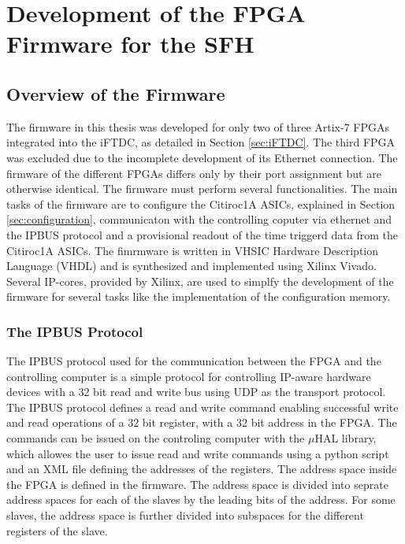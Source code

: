 \chapter{Development of the FPGA Firmware for the SFH}\label{cha:development}
\section{Overview of the Firmware}

The firmware in this thesis was developed for only two of three Artix-7 FPGAs integrated into the iFTDC, as detailed in Section \ref{sec:iFTDC}.
The third FPGA was excluded due to the incomplete development of its Ethernet connection.
\newline
The firmware of the different FPGAs differs only by their port assignment but are otherwise identical.
\newline
The firmware must perform several functionalities.
\newline
The main tasks of the firmware are to configure the Citiroc1A ASICs, explained in Section \ref{sec:configuration},
 communicaton with the controlling coputer via ethernet and the IPBUS protocol and a provisional readout of the time triggerd data from the Citiroc1A ASICs.
\newline
The fimrmware is written in VHSIC Hardware Description Language (VHDL) and is synthesized and implemented using Xilinx Vivado.
Several IP-cores, provided by Xilinx, are used to simplfy the development of the firmware for several tasks like the implementation of the configuration memory.
\subsection{The IPBUS Protocol}
The IPBUS protocol used for the communication between the FPGA and the controlling computer is a simple protocol for controlling IP-aware hardware devices with a 32 bit read and write bus using UDP as the transport protocol.\autocite{IPBUS_article}
\newline
The IPBUS protocol defines a read and write command enabling successful write and read operations of a 32 bit register, with a 32 bit address in the FPGA.    
\newline
The commands can be issued on the controling computer with the $\mu$HAL library, which allowes the user to issue read and write commands using a python script and an XML file defining the addresses of the registers.\autocite{IPBUS_article}
\newline
The address space inside the FPGA is defined in the firmware. The address space is divided into seprate address spaces for each of the slaves by the leading bits of the address.
For some slaves, the address space is further divided into subspaces for the different registers of the slave.


